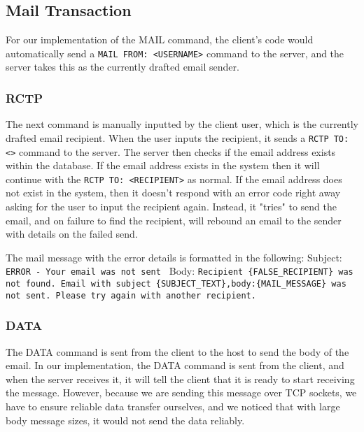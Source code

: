 \documentclass[12pt]{article}
\begin{document}
\subsection{Mail Transaction}

For our implementation of the MAIL command, the client's code would automatically send a \texttt{MAIL FROM: <USERNAME>} command to the server, and the server takes this as the currently drafted email sender.

\subsubsection{RCTP}
The next command is manually inputted by the client user, which is the currently drafted email recipient. When the user inputs the recipient, it sends a \texttt{RCTP TO: <>} command to the server. The server then checks if the email address exists within the database. If the email address exists in the system then it will continue with the \texttt{RCTP TO: <RECIPIENT>} as normal. If the email address does not exist in the system, then it doesn't respond with an error code right away asking for the user to input the recipient again. Instead, it "tries" to send the email, and on failure to find the recipient, will rebound an email to the sender with details on the failed send.

The mail message with the error details is formatted in the following:
\newline Subject: \texttt{ERROR - Your email was not sent }
\newline Body: \texttt{Recipient \{FALSE\_RECIPIENT\} was not found. \newline Email with subject \{SUBJECT\_TEXT\},\newline body:\{MAIL\_MESSAGE\} was not sent. \newline Please try again with another recipient.}

\subsubsection{DATA}

The DATA command is sent from the client to the host to send the body of the email. In our implementation, the DATA command is sent from the client, and when the server receives it, it will tell the client that it is ready to start receiving the message. However, because we are sending this message over TCP sockets, we have to ensure reliable data transfer ourselves, and we noticed that with large body message sizes, it would not send the data reliably. 
\end{document}
